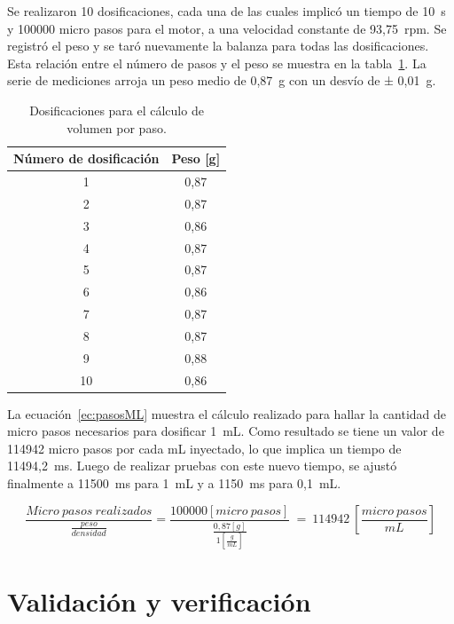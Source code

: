 Se realizaron 10 dosificaciones, cada una de las cuales implicó un tiempo de 10~s y 100000 micro pasos para el motor, a una velocidad constante de 93,75~rpm. Se registró el peso y se taró nuevamente la balanza para todas las dosificaciones. Esta relación entre el número de pasos y el peso se muestra en la tabla~\ref{tab:ensayoBomba}. La serie de mediciones arroja un peso medio de 0,87~g con un desvío de ± 0,01~g.

\begin{table}[h]
	\centering
	\caption[Dosificaciones]{Dosificaciones para el cálculo de volumen por paso.}
	\begin{tabular}{c c }    
		\toprule
		\textbf{Número de dosificación} & \textbf{Peso [g] } \\
		\midrule
		1 	& 0,87 \\	
		2	& 0,87 \\
		3	& 0,86 \\
		4	& 0,87 \\
		5	& 0,87 \\
		6	& 0,86 \\
		7	& 0,87 \\
		8	& 0,87 \\
		9	& 0,88 \\
		10	& 0,86 \\
		\bottomrule
		\hline
	\end{tabular}
	\label{tab:ensayoBomba}
\end{table}

La ecuación~\ref{ec:pasosML} muestra el cálculo realizado para hallar la cantidad de micro pasos necesarios para dosificar 1~mL. Como resultado se tiene un valor de 114942 micro pasos por cada mL inyectado, lo que implica un tiempo de 11494,2~ms. Luego de realizar pruebas con este nuevo tiempo, se ajustó finalmente a 11500~ms para 1~mL y a 1150~ms para 0,1~mL.

\begin{equation}
\frac{Micro\:pasos\:realizados}{\frac{peso}{densidad}} = \frac{100000 [micro\:pasos]}{\frac{0,87 [g]}{1[\frac{g}{mL}]}}\:=\:114942 \:[\frac{micro\:pasos}{mL}]
\label{ec:pasosML}
\end{equation}

\vspace{1,5 cm}


\section{Validación y verificación}
\label{sec:validacionVerificacion}

